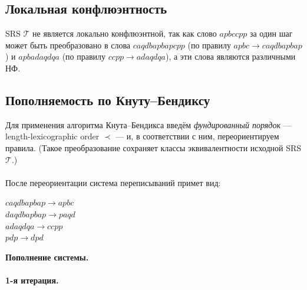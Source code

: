 \documentclass[a4paper,12pt]{article}
\newcommand{\T}{\mathcal{T}}
\begin{document}
\subsection{Локальная конфлюэнтность}

SRS $\T$ не является локально конфлюэнтной, так как слово $apbccpp$ за один шаг
может быть преобразовано в слова $caqdbapbapcpp$ (по правилу $apbc \rightarrow caqdbapbap$) 
и $apbadaqdqa$ (по правилу $ccpp \rightarrow adaqdqa$), а эти слова являются различными НФ.



\subsection{Пополняемость по Кнуту–Бендиксу}

Для применения алгоритма Кнута–Бендикса введём \emph{фундированный порядок} --- 
length-lexicographic order $\prec$ --- и, в соответствии с ним, переориентируем правила. 
(Такое преобразование сохраняет классы эквивалентности исходной SRS $\mathcal{T}$.) \\\\
После переориентации система переписываний примет вид:

\begin{flushleft} 
$caqdbapbap \rightarrow apbc$\\ 
$daqdbapbap \rightarrow paqd$\\ 
$adaqdqa \rightarrow ccpp$\\ 
$pdp \rightarrow dpd$ \\ 
\end{flushleft}

\noindent\textbf{Пополнение системы.} \\\\
\noindent\textbf{1-я итерация.} \\

 \\\\
\end{document}
